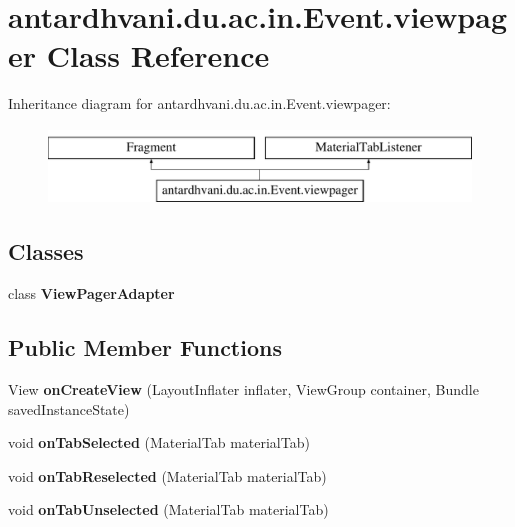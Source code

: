 \hypertarget{classantardhvani_1_1du_1_1ac_1_1in_1_1_event_1_1viewpager}{}\section{antardhvani.\+du.\+ac.\+in.\+Event.\+viewpager Class Reference}
\label{classantardhvani_1_1du_1_1ac_1_1in_1_1_event_1_1viewpager}
Inheritance diagram for antardhvani.\+du.\+ac.\+in.\+Event.\+viewpager\+:\begin{figure}[H]
\begin{center}
\leavevmode
\includegraphics[height=2.000000cm]{classantardhvani_1_1du_1_1ac_1_1in_1_1_event_1_1viewpager}
\end{center}
\end{figure}
\subsection*{Classes}
\begin{DoxyCompactItemize}
\item 
class {\bfseries View\+Pager\+Adapter}
\end{DoxyCompactItemize}
\subsection*{Public Member Functions}
\begin{DoxyCompactItemize}
\item 
\hypertarget{classantardhvani_1_1du_1_1ac_1_1in_1_1_event_1_1viewpager_ac3806238fa249569dcb67c6257724930}{}View {\bfseries on\+Create\+View} (Layout\+Inflater inflater, View\+Group container, Bundle saved\+Instance\+State)\label{classantardhvani_1_1du_1_1ac_1_1in_1_1_event_1_1viewpager_ac3806238fa249569dcb67c6257724930}

\item 
\hypertarget{classantardhvani_1_1du_1_1ac_1_1in_1_1_event_1_1viewpager_a9b445f4ca8e5470503403f7fe575e65c}{}void {\bfseries on\+Tab\+Selected} (Material\+Tab material\+Tab)\label{classantardhvani_1_1du_1_1ac_1_1in_1_1_event_1_1viewpager_a9b445f4ca8e5470503403f7fe575e65c}

\item 
\hypertarget{classantardhvani_1_1du_1_1ac_1_1in_1_1_event_1_1viewpager_a594de4a427009c3775a91ee24d1fe509}{}void {\bfseries on\+Tab\+Reselected} (Material\+Tab material\+Tab)\label{classantardhvani_1_1du_1_1ac_1_1in_1_1_event_1_1viewpager_a594de4a427009c3775a91ee24d1fe509}

\item 
\hypertarget{classantardhvani_1_1du_1_1ac_1_1in_1_1_event_1_1viewpager_a57f9cd3ce918bccfb307391400452bc9}{}void {\bfseries on\+Tab\+Unselected} (Material\+Tab material\+Tab)\label{classantardhvani_1_1du_1_1ac_1_1in_1_1_event_1_1viewpager_a57f9cd3ce918bccfb307391400452bc9}

\end{DoxyCompactItemize}
